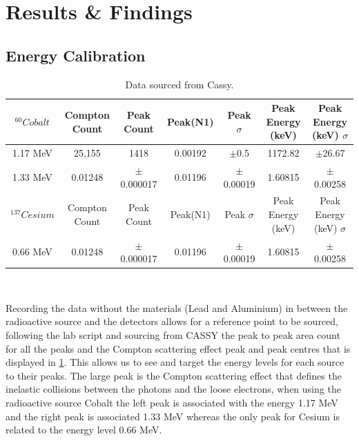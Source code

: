 \documentclass[12pt]{article}
\begin{document}
\section{Results \& Findings}
\label{Results & Findings Section}

\subsection{Energy Calibration}
\label{Energy Calibration SubSection}

\begin{table}[H]
\begin{center}
 \footnotesize
 \begin{tabular}{|c||c||c|c|c||c|c|}
 \hline
  $^{60}Cobalt$ & Compton Count & Peak Count & Peak(N1) & Peak $\sigma$ & Peak Energy (keV) & Peak Energy (keV) $\sigma$\\
 \hline 
  1.17 MeV & 25,155 & 1418 & 0.00192 & $\pm$0.5 & 1172.82 & $\pm$26.67 \\
 \hline
  1.33 MeV & 0.01248 & $\pm$0.000017 & 0.01196 & $\pm$0.00019 & 1.60815 & $\pm$0.00258 \\
 \hline \hline
  $^{137}Cesium$ & Compton Count & Peak Count & Peak(N1) & Peak $\sigma$ & Peak Energy (keV) & Peak Energy (keV) $\sigma$ \\
 \hline
 0.66 MeV & 0.01248 & $\pm$0.000017 & 0.01196 & $\pm$0.00019 & 1.60815 & $\pm$0.00258 \\
 \hline 
 \end{tabular} \\ 
 \caption{Data sourced from Cassy.}
 \label{Calibration Data}
\end{center}
\end{table}

Recording the data without the materials (Lead and Aluminium) in between the radioactive source and the detectors allows for a reference point to be sourced, following the lab script \cite{Exp.C-2020} and sourcing from CASSY the peak to peak area count for all the peaks and the Compton scattering effect peak and peak centres that is displayed in \cref{Calibration Data}. This allows us to see and target the energy levels for each source to their peaks. The large peak is the Compton scattering effect that defines the inelastic collisions between the photons and the loose electrons, when using the radioactive source Cobalt the left peak is associated with the energy 1.17 MeV and the right peak is associated 1.33 MeV whereas the only peak for Cesium is related to the energy level 0.66 MeV.
\end{document}
